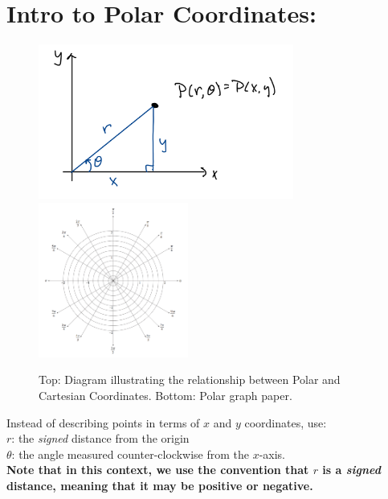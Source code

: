 \section*{Intro to Polar Coordinates:}





\begin{figure}[!h]

\includegraphics[height=2in]{Ch12s3-Polar-Coordinates.jpeg}\\

\includegraphics[height=2in]{PolarPaper.png}

\caption{Top: Diagram illustrating the relationship between Polar and Cartesian Coordinates. Bottom: Polar graph paper.}
\end{figure}

\hspace*{.2in}

Instead of describing points in terms of \(x\) and \(y\) coordinates, use:\\

\(r\): the \textit{signed} distance from the origin\\
\(\theta\): the angle measured counter-clockwise from the \(x\)-axis.\\


\textbf{Note that in this context, we use the convention that \(r\) is a \textit{signed} distance, meaning that it may be positive or negative.}\\

